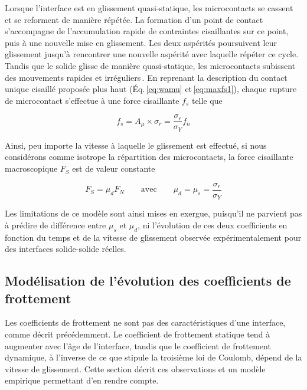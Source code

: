 

Lorsque l'interface est en glissement quasi-statique, les microcontacts se cassent et se reforment de manière répétée. La formation d'un point de contact s'accompagne de l'accumulation rapide de contraintes cisaillantes sur ce point, puis à une nouvelle mise en glissement. Les deux aspérités poursuivent leur glissement jusqu'à rencontrer une nouvelle aspérité avec laquelle répéter ce cycle. Tandis que le solide glisse de manière quasi-statique, les microcontacts subissent des mouvements rapides et irréguliers\,\cite{persson_sliding_1998,beig_friction_2006}. En reprenant la description du contact unique cisaillé proposée plus haut (Éq.\,\ref{eq:wamu} et\,\ref{eq:maxfs1}), chaque rupture de microcontact s'effectue à une force cisaillante $f_s$ telle que

\begin{equation}
f_s=A_\mu\times\sigma_r= \dfrac{\sigma_r}{\sigma_Y}f_n
\end{equation}

Ainsi, peu importe la vitesse à laquelle le glissement est effectué, si nous considérons comme isotrope la répartition des microcontacts, la force cisaillante macroscopique $F_S$ est de valeur constante

\begin{equation}
F_S = \mu_dF_N\qquad\text{avec} \qquad \mu_d = \mu_s = \dfrac{\sigma_r}{\sigma_Y}
\label{eq:maxfs}
\end{equation}


Les limitations de ce modèle sont ainsi mises en exergue, puisqu'il ne parvient pas à prédire de différence entre $\mu_s$ et $\mu_d$, ni l'évolution de ces deux coefficients en fonction du temps et de la vitesse de glissement observée expérimentalement pour des interfaces solide-solide réelles.



\subsection[Modélisation de l'évolution de $\mu$]{Modélisation de l'évolution des coefficients de frottement}
\label{sec:evolutionmacro}

Les coefficients de frottement ne sont pas des caractéristiques d'une interface, comme décrit précédemment. Le coefficient de frottement statique tend à augmenter avec l'âge de l'interface, tandis que le coefficient de frottement dynamique, à l'inverse de ce que stipule la troisième loi de Coulomb, dépend de la vitesse de glissement. Cette section décrit ces observations et un modèle empirique permettant d'en rendre compte.


